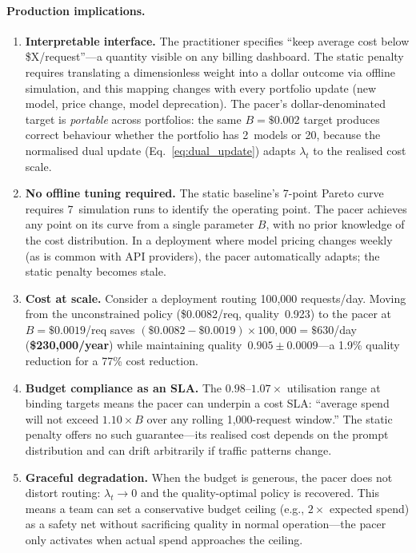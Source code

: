 \paragraph{Production implications.}
\begin{enumerate}[leftmargin=*,noitemsep]
  \item \textbf{Interpretable interface.}
    The practitioner specifies ``keep average cost below
    \$X/request''---a quantity visible on any billing dashboard.
    The static penalty requires translating a dimensionless weight
    into a dollar outcome via offline simulation, and this mapping
    changes with every portfolio update (new model, price change,
    model deprecation).
    The pacer's dollar-denominated target is \emph{portable} across
    portfolios: the same $B{=}\$0.002$ target produces correct
    behaviour whether the portfolio has 2~models or 20, because the
    normalised dual update (Eq.~\ref{eq:dual_update}) adapts $\lambda_t$
    to the realised cost scale.

  \item \textbf{No offline tuning required.}
    The static baseline's 7-point Pareto curve requires 7~simulation
    runs to identify the operating point.
    The pacer achieves any point on its curve from a single parameter
    $B$, with no prior knowledge of the cost distribution.
    In a deployment where model pricing changes weekly (as is common
    with API providers), the pacer automatically adapts; the static
    penalty becomes stale.

  \item \textbf{Cost at scale.}
    Consider a deployment routing 100{,}000 requests/day.
    Moving from the unconstrained policy (\$0.0082/req, quality~0.923)
    to the pacer at $B{=}\$0.0019$/req saves
    $(\$0.0082 - \$0.0019) \times 100{,}000 = \$630$/day
    (\textbf{\$230{,}000/year})
    while maintaining quality~$0.905 \pm 0.0009$---a 1.9\% quality
    reduction for a 77\% cost reduction.

  \item \textbf{Budget compliance as an SLA.}
    The $0.98$--$1.07\times$ utilisation range at binding targets
    means the pacer can underpin a cost SLA:
    ``average spend will not exceed $1.10 \times B$ over any
    rolling 1{,}000-request window.''
    The static penalty offers no such guarantee---its realised cost
    depends on the prompt distribution and can drift arbitrarily
    if traffic patterns change.

  \item \textbf{Graceful degradation.}
    When the budget is generous, the pacer does not distort routing:
    $\lambda_t \to 0$ and the quality-optimal policy is recovered.
    This means a team can set a conservative budget ceiling
    (e.g., $2\times$ expected spend) as a safety net without
    sacrificing quality in normal operation---the pacer only activates
    when actual spend approaches the ceiling.
\end{enumerate}
